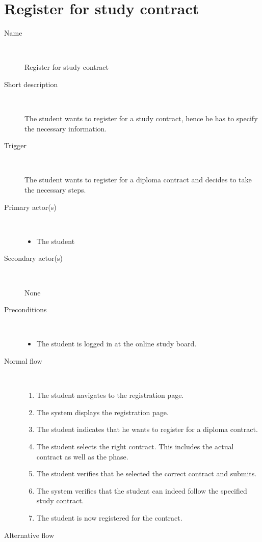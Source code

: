 \section{Register for study contract}

\begin{description}
	\item[Name] \
		\par Register for study contract
	\item[Short description] \ 
			\par The student wants to register for a study contract, hence he has to
			specify the necessary information.
	\item[Trigger] \ 
			\par The student wants to register for a diploma contract and decides to take
			the necessary steps.
	\item[Primary actor(s)] \ 
		\begin{itemize}
		  \item The student
		\end{itemize}
	\item[Secondary actor(s)] \ 
		\par None
	\item[Preconditions] \ 
	\begin{itemize}
		\item The student is logged in at the online study board.
	\end{itemize}
	\item[Normal flow] \ 
	\begin{enumerate}
	  	\item The student navigates to the registration page.
	  	\item The system displays the registration page.
	  	\item The student indicates that he wants to register for a diploma
	  	contract.
	  	\item The student selects the right contract. This includes the actual
	  	contract as well as the phase.
	  	\item The student verifies that he selected the correct contract and submits.
	  	\item The system verifies that the student can indeed follow the specified
	  	study contract.
	  	\item The student is now registered for the contract.
	\end{enumerate}
	\item[Alternative flow] \

\end{description}
